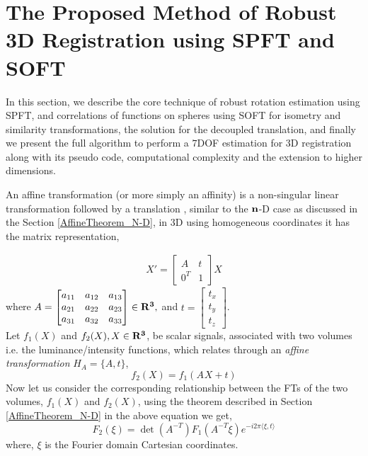 \documentclass{UCF_ETD}
\begin{document}
\section{The Proposed Method of Robust 3D Registration using SPFT and SOFT} \label{3D Affine Estimation}

In this section, we describe the core technique of robust rotation estimation using SPFT, and correlations of functions on spheres using SOFT for isometry and similarity transformations, the solution for the decoupled translation, and finally we present the full algorithm to perform a $7$DOF estimation for $3$D registration along with its pseudo code, computational complexity and 
the extension to higher dimensions. 

An affine transformation (or more simply an affinity) is a non-singular linear transformation followed by a translation \cite{Zisserman03}, similar to the ${\bf n}$-D case as discussed in the Section \ref{AffineTheorem_N-D}, in $3$D using homogeneous coordinates it has the matrix representation,

\begin{eqnarray}
X'= 
  \begin{bmatrix}     
      A & t\\
      0^T & 1
  \end{bmatrix} X
 \end{eqnarray}
 where
  $A = 
    \begin{bmatrix}    
       a_{11} & a_{12} & a_{13}  \\
       a_{21} & a_{22} & a_{23}\\
       a_{31} & a_{32} & a_{33}
   \end{bmatrix}  \in {\bf R^3},$
    and 
     $ t =
    \begin{bmatrix}   
        t_x\\
        t_y\\
        t_z
    \end{bmatrix} $.\\
\indent Let $f_1(X)$ and $f_2(X), X \in {\bf R^3}$, be scalar signals, associated with two volumes i.e. the luminance/intensity functions, which relates through an \emph{affine transformation} $H_A = \{A , t\}$, 
\begin{equation} \label{AffineTrans}
f_2 (X) = f_1(A^{}X+t)
\end{equation}
\indent Now let us consider the corresponding relationship between the FTs of the two volumes, $f_1(X)$ and $f_2(X)$,  using the theorem described in Section \ref{AffineTheorem_N-D} in the above equation we get,
\begin{equation} \label{AffineTransFourier}
F_2(\xi) =  \det(A^{-T}) F_1( A^{-T} \xi)e^{-i2\pi \langle {\xi}, t \rangle}	
\end{equation}
where, $\xi$
is the Fourier domain Cartesian coordinates. 
\end{document}
